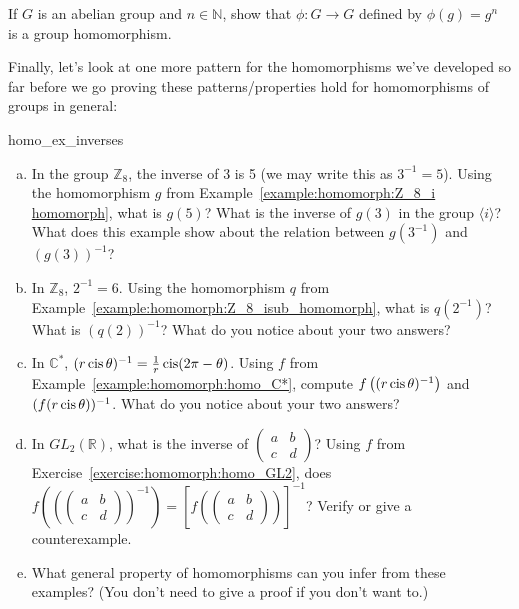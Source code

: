  
\begin{exercise}{}
If $G$ is an abelian group and $n \in {\mathbb N}$, show that $\phi : G
\rightarrow G$  defined by $\phi(g) = g^n$ is a group homomorphism.  
\end{exercise}

Finally, let's look at one more pattern for the homomorphisms we've developed so far before we go proving these patterns/properties hold for homomorphisms of groups in general:

\begin{exercise}{homo_ex_inverses}
\begin{enumerate}[(a)]
\item
In the group ${\mathbb Z}_8$, the inverse of 3 is 5 (we may write this as $3^{-1} = 5$).  Using the homomorphism $g$ from Example~\ref{example:homomorph:Z_8_i homomorph}, what is $g(5)$?  What is the inverse of $g(3)$ in the group $\langle i \rangle$? What does this example show about the relation between $g(3^{-1})$ and $(g(3))^{-1}$?
\item
In ${\mathbb Z}_8$, $2^{-1} = 6$.  Using the homomorphism $q$ from Example~\ref{example:homomorph:Z_8_isub_homomorph}, what is $q(2^{-1})$?  What is $(q(2))^{-1}$? What do you notice about your two answers?
\item
In  ${\mathbb C}^\ast$, $(r \operatorname{cis} \theta)^{-1} = \frac{1}{r} \operatorname{cis} (2\pi - \theta)$.  Using $f$ from Example~\ref{example:homomorph:homo_C*},  compute $f\left((r \operatorname{cis} \theta)^{-1}\right)$ and $(f(r \operatorname{cis} \theta))^{-1}$. What do you notice about your two answers? 
\item
In $GL_2( {\mathbb R })$, what is the inverse of
$\begin{pmatrix}
a & b \\
c & d
\end{pmatrix}$?
Using $f$ from Exercise~\ref{exercise:homomorph:homo_GL2}, does $f\left((\begin{pmatrix} a & b \\ c & d \end{pmatrix})^{-1}\right) = [f(\begin{pmatrix} a & b \\ c & d \end{pmatrix})]^{-1}$?  Verify or give a counterexample.
\item
What general property of homomorphisms can you infer from these examples? (You don't need to give a proof if you don't want to.)
\end{enumerate}
\end{exercise}


